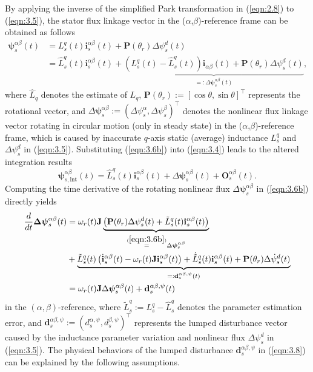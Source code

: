 By applying the inverse of the simplified Park transformation in (\ref{eqn:2.8}) to (\ref{eqn:3.5}), the stator flux linkage vector in the ($\alpha$,$\beta$)-reference frame can be obtained as follows
\begin{align}\label{eqn:3.6a}
\boldsymbol{\psi}^{\alpha\beta}_s(t) &= L^q_s(t) \mathbf{i}^{\alpha\beta}_s(t) + 
\mathbf{P}(\theta_r)
\Delta \psi^{d}_s(t)\\\label{eqn:3.6b}
&= \hat{L}^q_s(t) \mathbf{i}^{\alpha\beta}_s(t) + 
 \underbrace{(L^q_s(t) -\hat{L}^q_s(t))\mathbf{i}_{\alpha\beta}(t) + \mathbf{P}(\theta_r)
\Delta \psi^{d}_s(t)}_{=:\Delta \boldsymbol{\psi}^{\alpha \beta}_s(t)} ,
\end{align}
where $\hat{L}_q$ denotes the estimate of $L_q$, $\mathbf{P}(\theta_r) := [\cos\theta, \sin\theta]^\top$ represents the rotational vector, and $\Delta \boldsymbol{\psi}^{\alpha \beta}_s := (\Delta \psi^\alpha_s,\Delta \psi^\beta_s)^\top$ denotes the nonlinear flux linkage vector rotating in circular motion (only in steady state) in the ($\alpha$,$\beta$)-reference frame, which is caused by inaccurate $q$-axis static (average) inductance $L^q_s$ and $\Delta\psi^d_s$ in (\ref{eqn:3.5}). Substituting (\ref{eqn:3.6b}) into (\ref{eqn:3.4}) leads to the altered integration results
\begin{equation}\label{eqn:3.7}
\boldsymbol{\psi}^{\alpha\beta}_{s,\text{int}}(t) = \hat{L}^q_s(t) \mathbf{i}^{\alpha\beta}_s(t) + 
\Delta \boldsymbol{\psi}^{\alpha \beta}_s(t) + \mathbf{O}^{\alpha\beta}_s(t).
\end{equation}
Computing the time derivative of the rotating nonlinear flux $\Delta \boldsymbol{\psi}^{\alpha \beta}_s$ in (\ref{eqn:3.6b}) directly yields
\begin{equation}\label{eqn:3.8}
\begin{aligned}
\frac{d}{dt}{\boldsymbol{\Delta \psi}}^{\alpha\beta}_s(t) &= \omega_r(t) \mathbf{J}\underbrace{\left(\mathbf{P}(\theta_r)\Delta \psi^{d}_s(t) + \tilde{L}^q_s(t)\mathbf{i}^{\alpha\beta}_s(t)\right)}_{\stackrel{(\ref{eqn:3.6b})}=\Delta\boldsymbol{\psi}^{\alpha\beta}_s}\\
&+\underbrace{\tilde{L}^q_s(t)\left(\dot{\mathbf{ i}}^{\alpha\beta}_s(t)-\omega_r(t) \mathbf{J}\mathbf{i}^{\alpha\beta}_s(t)\right) + \dot{\tilde{L}}^q_s(t)\mathbf{i}^{\alpha\beta}_s(t) + \mathbf{P}(\theta_r) \Delta \dot\psi^{ d}_s(t)}_{=:\mathbf{d}^{\alpha\beta,\psi}_{s}(t)}
\\
&= \omega_r(t) \mathbf{J} \Delta \boldsymbol{\psi}^{\alpha\beta}_s(t) + \mathbf{d}^{\alpha\beta,\psi}_{s}(t)
\end{aligned}
\end{equation}
in the $(\alpha,\beta)$-reference, where \( \tilde{L}^q_s :=  L^q_s-\hat{L}^q_s \) denotes the parameter estimation error, and \(\mathbf{d}^{\alpha\beta,\psi}_{s} := (d^{\alpha,\psi}_{s}, d^{\beta,\psi}_{s})^\top\) represents the lumped disturbance vector caused by the inductance parameter variation and nonlinear flux $\Delta\psi^d_s$ in (\ref{eqn:3.5}). The physical behaviors of the lumped disturbance $\mathbf{d}^{\alpha\beta,\psi}_{s}$ in (\ref{eqn:3.8}) can be explained by the following assumptions.

